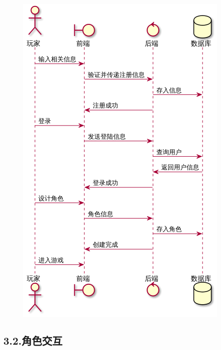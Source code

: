 \documentclass{article}
\begin{document}
\begin{figure}[tbp]%
\begin{mdcenter}%

\noindent{}\includegraphics[keepaspectratio=true,width=\dimwidth{1.00}]{./img/7}{}%

\mdhr{}%

\noindent{}%
\end{mdcenter}%
\end{figure}%

\subsection{3.2.\hspace*{0.5em}角色交互}\label{32}%

\end{document}
